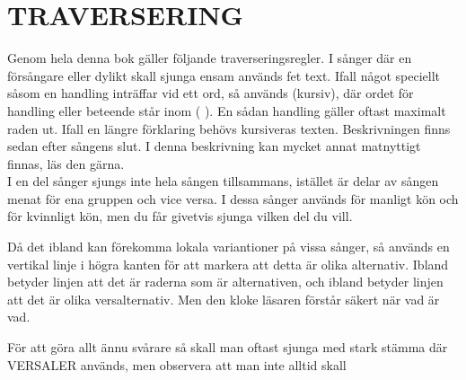\documentclass[a6paper,fontsize=10pt,twoside,open=right]{scrbook}
\newcommand*\cleartoleftpage{%
  \clearpage
  \ifodd\value{page}\hbox{}\newpage\fi
}
\begin{document}

\cleartoleftpage
\section{TRAVERSERING}\vspace{10pt}
\hspace{10pt}Genom hela denna bok gäller följande
traverseringsregler. I sånger där en försångare eller dylikt skall
sjunga ensam används fet text. Ifall något speciellt såsom en handling
inträffar vid ett ord, så används (kursiv), där ordet för handling
eller beteende står inom ( ). En sådan handling gäller oftast maximalt
raden ut. Ifall en längre förklaring behövs kursiveras
texten. Beskrivningen finns sedan efter sångens slut. I denna
beskrivning kan mycket annat matnyttigt finnas, läs den
gärna.\\ \indent I en del sånger sjungs inte hela sången tillsammans,
istället är delar av sången menat för ena gruppen och vice versa. I
dessa sånger används {\Large\Male} för manligt kön och {\Large\Female}
för kvinnligt kön, men du får givetvis sjunga vilken del du vill.
\begin{leftborder}
  \hspace{10pt}Då det ibland kan förekomma lokala variantioner på vissa sånger, så
  används en  vertikal linje i högra kanten för att markera att detta
  är olika alternativ. Ibland betyder linjen att det är raderna som är
  alternativen, och ibland betyder linjen att det är olika
  versalternativ. Men den kloke läsaren förstår säkert när vad är vad.
\end{leftborder}
\hspace{15pt} För att göra allt ännu svårare så skall man oftast sjunga med stark
stämma där VERSALER används, men observera att man inte alltid skall
\end{document}
